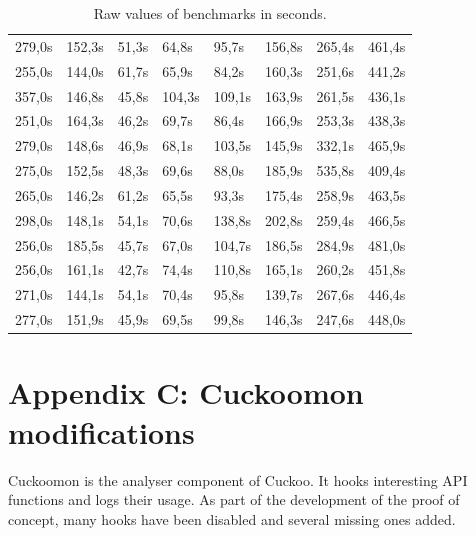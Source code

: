 \documentclass{scrartcl}
\begin{document}
\begin{table}[h]
\begin{tabular}{@{}llllllll@{}}
279,0s  & 152,3s  & 51,3s       & 64,8s       & 95,7s        & 156,8s       & 265,4s       & 461,4s        \\
255,0s  & 144,0s  & 61,7s       & 65,9s       & 84,2s        & 160,3s       & 251,6s       & 441,2s        \\
357,0s  & 146,8s  & 45,8s       & 104,3s      & 109,1s       & 163,9s       & 261,5s       & 436,1s        \\
251,0s  & 164,3s  & 46,2s       & 69,7s       & 86,4s        & 166,9s       & 253,3s       & 438,3s        \\
279,0s  & 148,6s  & 46,9s       & 68,1s       & 103,5s       & 145,9s       & 332,1s       & 465,9s        \\
275,0s  & 152,5s  & 48,3s       & 69,6s       & 88,0s        & 185,9s       & 535,8s       & 409,4s        \\
265,0s  & 146,2s  & 61,2s       & 65,5s       & 93,3s        & 175,4s       & 258,9s       & 463,5s        \\
298,0s  & 148,1s  & 54,1s       & 70,6s       & 138,8s       & 202,8s       & 259,4s       & 466,5s        \\
256,0s  & 185,5s  & 45,7s       & 67,0s       & 104,7s       & 186,5s       & 284,9s       & 481,0s        \\
256,0s  & 161,1s  & 42,7s       & 74,4s       & 110,8s       & 165,1s       & 260,2s       & 451,8s        \\
271,0s  & 144,1s  & 54,1s       & 70,4s       & 95,8s        & 139,7s       & 267,6s       & 446,4s        \\
277,0s  & 151,9s  & 45,9s       & 69,5s       & 99,8s        & 146,3s       & 247,6s       & 448,0s        \\ \bottomrule
\end{tabular}
\caption{Raw values of benchmarks in seconds.}
\label{my-label}
\end{table}

\clearpage

\section*{Appendix C: Cuckoomon modifications}
\label{cuckoomonmods}

Cuckoomon is the analyser component of Cuckoo. It hooks interesting API functions and logs their usage. As part of the development of the proof of concept, many hooks have been disabled and several missing ones added.
\end{document}
